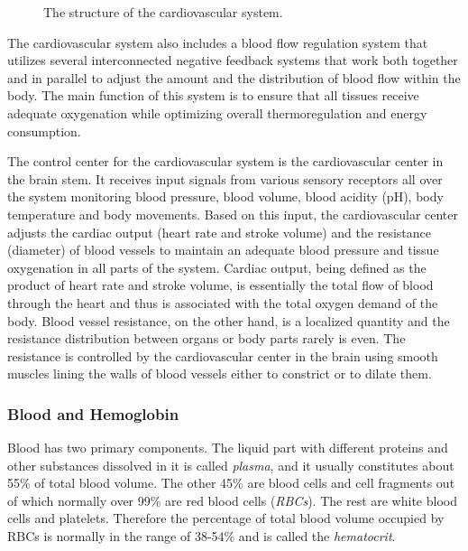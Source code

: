 \begin{figure}[htcb]
\caption{The structure of the cardiovascular system. \cite{urgomedical.com}}
\label{fig:cardiovascular_system}
\end{figure}

The cardiovascular system also includes a blood flow regulation system that utilizes several interconnected negative feedback systems that work both together and in parallel to adjust the amount and the distribution of blood flow within the body. The main function of this system is to ensure that all tissues receive adequate oxygenation while optimizing overall thermoregulation and energy consumption.

The control center for the cardiovascular system is the cardiovascular center in the brain stem. It receives input signals from various sensory receptors all over the system monitoring blood pressure, blood volume, blood acidity (pH), body temperature and body movements. Based on this input, the cardiovascular center adjusts the cardiac output (heart rate and stroke volume) and the resistance (diameter) of blood vessels to maintain an adequate blood pressure and tissue oxygenation in all parts of the system. Cardiac output, being defined as the product of heart rate and stroke volume, is essentially the total flow of blood through the heart and thus is associated with the total oxygen demand of the body. Blood vessel resistance, on the other hand, is a localized quantity and the resistance distribution between organs or body parts rarely is even. The resistance is controlled by the cardiovascular center in the brain using smooth muscles lining the walls of blood vessels either to constrict or to dilate them.\ \cite{Tortora2000}

\subsubsection{Blood and Hemoglobin}

Blood has two primary components. The liquid part with different proteins and other substances dissolved in it is called \textit{plasma}, and it usually constitutes about 55\% of total blood volume. The other 45\% are blood cells and cell fragments out of which normally over 99\% are red blood cells (\textit{RBCs}). The rest are white blood cells and platelets. Therefore the percentage of total blood volume occupied by RBCs is normally in the range of 38-54\% and is called the \textit{hematocrit}.\ \cite{Tortora2000}


